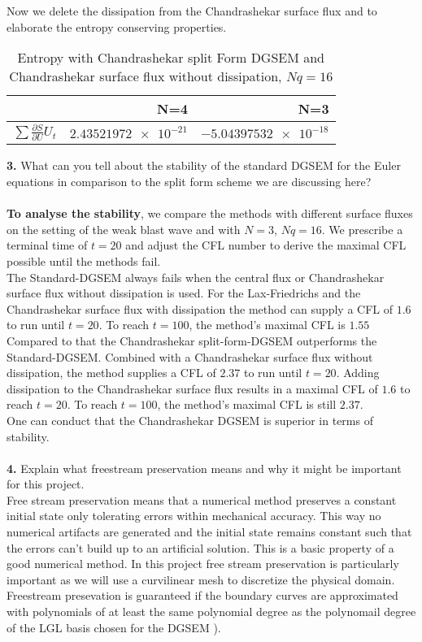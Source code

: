 \documentclass[11pt]{scrartcl}
\begin{document}
Now we delete the dissipation from the Chandrashekar surface flux and to elaborate the entropy conserving properties.
\begin{table}[H]
\centering
\begin{tabular}{|r|r|r|}
    \hline\hline
     & \textbf{N=4} & \textbf{N=3} \\\hline
    $\sum \frac{\partial S}{\partial U} U_t$ & $\num{2.43521972e-21}$ & $\num{-5.04397532e-18}$ \\\hline\hline
\end{tabular}
\caption{Entropy with Chandrashekar split Form DGSEM and Chandrashekar surface flux without dissipation, $Nq = 16$}
\end{table}

\textbf{3.} What can you tell about the stability of the standard DGSEM for the Euler equations in comparison to the split form scheme we are discussing here? \\ \ \\
\textbf{To analyse the stability}, we compare the methods with different surface fluxes on the setting of the weak blast wave and with $N=3$, $Nq = 16$. We prescribe a terminal time of $t=20$ and adjust the CFL number to derive the maximal CFL possible until the methods fail. \\
The Standard-DGSEM always fails when the central flux or Chandrashekar surface flux without dissipation is used. For the Lax-Friedrichs and the Chandrashekar surface flux with dissipation the method can supply a CFL of $1.6$ to run until $t=20$. To reach $t=100$, the method's maximal CFL is $1.55$\\
Compared to that the Chandrashekar split-form-DGSEM outperforms the Standard-DGSEM. Combined with a Chandrashekar surface flux without dissipation, the method supplies a CFL of $2.37$ to run until $t=20$. Adding dissipation to the Chandrashekar surface flux results in a maximal CFL of $1.6$ to reach $t=20$. To reach $t=100$, the method's maximal CFL is still $2.37$. \\
One can conduct that the Chandrashekar DGSEM is superior in terms of stability.
\\ \ \\
\textbf{4.} Explain what freestream preservation means and why it might be important for this project. \\
Free stream preservation means that a numerical method preserves a constant initial state only tolerating errors within mechanical accuracy. This way no numerical artifacts are generated and the initial state remains constant such that the errors can't build up to an artificial solution. This is a basic property of a good numerical method. In this project free stream preservation is particularly important as we will use a curvilinear mesh to discretize the physical domain. Freestream presevation is guaranteed if the boundary curves are approximated with polynomials of at least the same polynomial degree as the polynomail degree of the LGL basis chosen for the DGSEM \cite{Gassner_WR1}).
\end{document}
